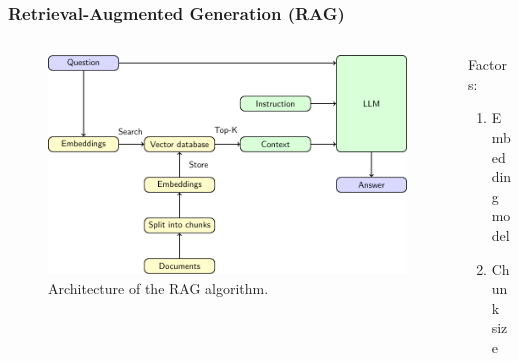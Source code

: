 \documentclass{beamer}
\begin{document}
\begin{frame}
  \frametitle{Retrieval-Augmented Generation (RAG)}
  \begin{columns}[onlytextwidth,T]
    \begin{column}{0.75\textwidth}
      \begin{figure}[h]
        \includegraphics[scale=0.6]{src/fig/pdfs/tikz/RAG_scheme.pdf}
        \caption{Architecture of the RAG algorithm.}
       \end{figure}
    \end{column}

      \begin{column}{0.75\textwidth}
        Factors:  
        \begin{enumerate}
          \item Embedding \\model
          \item Chunk size
        \end{enumerate}
    \end{column}
  \end{columns}
  
  
\end{frame}
\end{document}
